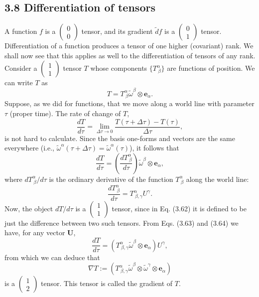 \documentclass[12pt]{book}
\begin{document}
    \subsection{3.8 Differentiation of tensors}
    A function \(f\) is a \(\left(\begin{array}{c} 0 \\ 0 \end{array}\right)\) tensor, and its gradient \(\tilde{d}f\) is a \(\left(\begin{array}{c} 0 \\ 1 \end{array}\right)\) tensor. Differentiation of a function produces a tensor of one higher (covariant) rank. We shall now see that this applies as well to the differentiation of tensors of any rank. 
    Consider a \(\left(\begin{array}{c} 1 \\ 1 \end{array}\right)\) tensor \(T\) whose components \(\{T^\alpha_{\ \beta}\}\) are functions of position. We can write \(T\) as
    \[
    T = T^\alpha_{\ \beta} \tilde{\omega}^\beta \otimes \mathbf{e}_\alpha. \tag{3.61}
    \]
    Suppose, as we did for functions, that we move along a world line with parameter \(\tau\) (proper time). The rate of change of \(T\),
    \[
    \frac{dT}{d\tau} = \lim_{\Delta \tau \rightarrow 0} \frac{T(\tau + \Delta \tau) - T(\tau)}{\Delta \tau}, \tag{3.62}
    \]
    is not hard to calculate. Since the basis one-forms and vectors are the same everywhere (i.e., \(\tilde{\omega}^\alpha(\tau + \Delta \tau) = \tilde{\omega}^\alpha(\tau)\)), it follows that
    \[
    \frac{dT}{d\tau} = \left(\frac{dT^\alpha_{\ \beta}}{d\tau}\right) \tilde{\omega}^\beta \otimes \mathbf{e}_\alpha, \tag{3.63}
    \]
    where \(dT^\alpha_{\ \beta}/d\tau\) is the ordinary derivative of the function \(T^\alpha_{\ \beta}\) along the world line:
    \[
    \frac{dT^\alpha_{\ \beta}}{d\tau} = T^\alpha_{\ \beta, \gamma} U^\gamma. \tag{3.64}
    \]
    Now, the object \(dT/d\tau\) is a \(\left(\begin{array}{c} 1 \\ 1 \end{array}\right)\) tensor, since in Eq. (3.62) it is defined to be just the difference between two such tensors. From Eqs. (3.63) and (3.64) we have, for any vector \(\mathbf{U}\),
    \[
    \frac{dT}{d\tau} = \left(T^\alpha_{\ \beta, \gamma} \tilde{\omega}^\beta \otimes \mathbf{e}_\alpha\right) U^\gamma, \tag{3.65}
    \]
    from which we can deduce that
    \[
    \nabla T := \left(T^\alpha_{\ \beta, \gamma} \tilde{\omega}^\beta \otimes \tilde{\omega}^\gamma \otimes \mathbf{e}_\alpha\right) \tag{3.66}
    \]
    is a \(\left(\begin{array}{c} 1 \\ 2 \end{array}\right)\) tensor. This tensor is called the gradient of \(T\).
    
\end{document}
